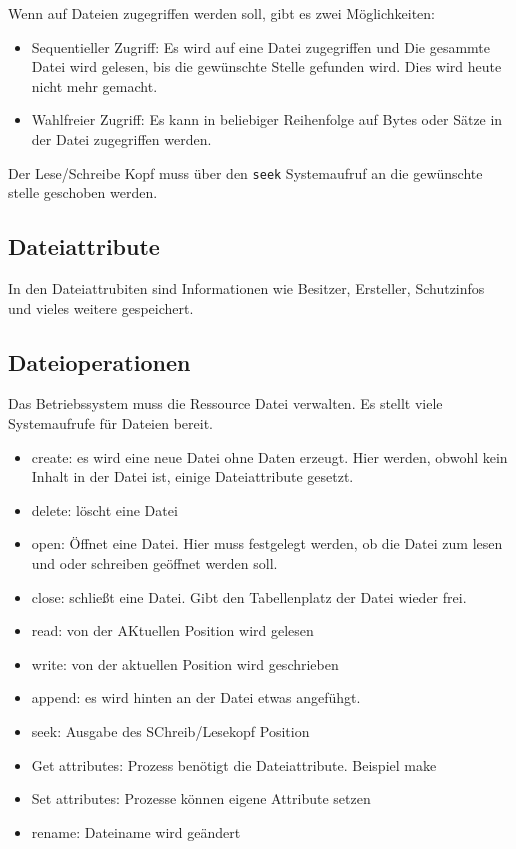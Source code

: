 Wenn auf Dateien zugegriffen werden soll, gibt es zwei Möglichkeiten:

\begin{itemize}
    \item Sequentieller Zugriff: Es wird auf eine Datei zugegriffen und Die gesammte
          Datei wird gelesen, bis die gewünschte Stelle gefunden wird. Dies wird heute
          nicht mehr gemacht.
    \item Wahlfreier Zugriff: Es kann in beliebiger Reihenfolge auf Bytes oder Sätze in
          der Datei zugegriffen werden.
\end{itemize}

Der Lese/Schreibe Kopf muss über den \texttt{seek} Systemaufruf an die
gewünschte stelle geschoben werden.

\subsection{Dateiattribute}

In den Dateiattrubiten sind Informationen wie Besitzer, Ersteller, Schutzinfos
und vieles weitere gespeichert.

\subsection{Dateioperationen}

Das Betriebssystem muss die Ressource Datei verwalten. Es stellt viele
Systemaufrufe für Dateien bereit.

\begin{itemize}
    \item create: es wird eine neue Datei ohne Daten erzeugt. Hier werden, obwohl kein
          Inhalt in der Datei ist, einige Dateiattribute gesetzt.
    \item delete: löscht eine Datei
    \item open: Öffnet eine Datei. Hier muss festgelegt werden, ob die Datei zum lesen
          und oder schreiben geöffnet werden soll.
    \item close: schließt eine Datei. Gibt den Tabellenplatz der Datei wieder frei.
    \item read: von der AKtuellen Position wird gelesen
    \item write: von der aktuellen Position wird geschrieben
    \item append: es wird hinten an der Datei etwas angefühgt.
    \item seek: Ausgabe des SChreib/Lesekopf Position
    \item Get attributes: Prozess benötigt die Dateiattribute. Beispiel make
    \item Set attributes: Prozesse können eigene Attribute setzen
    \item rename: Dateiname wird geändert
\end{itemize}

